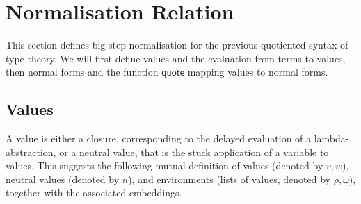 \documentclass[a4paper,english]{lipics-v2019}
\newcommand{\agdaSymb}[1]{\mathsf{#1}}
\newcommand{\q}{\agdaSymb{quote}}
\begin{document}
\section{Normalisation Relation}
\label{sec:normalisation}
This section defines big step normalisation for the previous quotiented syntax
of type theory. We will first define values and the evaluation from terms to
values, then normal forms and the function $\q$ mapping values to normal forms.

\subsection{Values}
A value is either a closure, corresponding to the delayed evaluation of a
lambda-abstraction, or a neutral value, that is the stuck application of a
variable to values. This suggests the following mutual definition of values
(denoted by $v,w$), neutral values (denoted by $n$), and environments (lists of
values, denoted by $\rho,\omega$), together with the associated embeddings.
\end{document}
